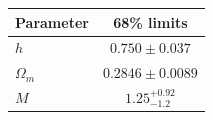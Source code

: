 \begin{tabular} { l  c}

 Parameter &  68\% limits\\
\hline
{\boldmath$h              $} & $0.750\pm 0.037            $\\

{\boldmath$Ω_m            $} & $0.2846\pm 0.0089          $\\

{\boldmath$M              $} & $1.25^{+0.92}_{-1.2}       $\\
\hline
\end{tabular}